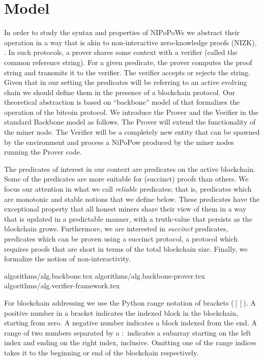 \section{Model}

In order to study the syntax and properties of NIPoPoWs
we abstract their operation in a way that is akin to non-interactive
zero-knowledge proofs (NIZK), \cite{BFM88}. In such protocols, a prover
shares some context with a verifier (called the common reference string).
For a given predicate, the prover computes the proof string and transmits it
to the verifier. The verifier accepts or rejects the string. Given that in our
setting the predicates will be referring to an active evolving chain 
we should define them in the presence of a blockchain protocol. 
Our theoretical abstraction is based on ``backbone'' model of
\cite{backbone} that formalizes the operation of the bitcoin protocol.
We introduce the Prover and the Verifier in
the standard Backbone model as follows. The Prover will extend the functionality
of the miner node. The Verifier will be a completely new entity that can be spawned
by the environment and process a NiPoPow produced by the miner nodes running
the Prover code. 

The predicates of interest in our context are predicates on the active blockchain. 
Some of the predicates are more suitable for (succinct) proofs than others. We focus
our attention in what we call \textit{reliable} predicates; that is,
predicates which are monotonic and stable notions that we define below.  
These predicates have the
exceptional property that all honest miners share their view of them in a way
that is updated in a predictable manner, with a truth-value that persists as the
blockchain grows.  Furthermore, we are interested in \textit{succinct}
predicates, predicates which can be proven using a succinct protocol, a
protocol which requires proofs that are short in terms of the total blockchain
size. Finally, we formalize the notion of non-interactivity.


{algorithms/alg.backbone.tex}
{algorithms/alg.backbone-prover.tex}
{algorithms/alg.verifier-framework.tex}

For blockchain addressing we use the Python range notation of brackets ($[]$).
A positive number in a bracket indicates the indexed block in the blockchain,
starting from zero. A negative number indicates a block indexed from the end. A
range of two numbers separated by a $:$ indicates a subarray starting on the
left index and ending on the right index, inclusive. Omitting one of the range
indices takes it to the beginning or end of the blockchain respectively.

